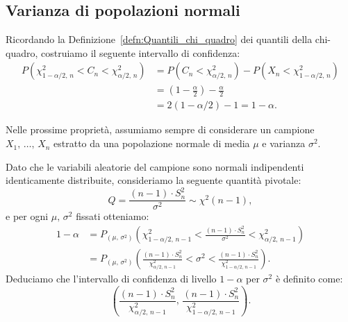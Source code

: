         \subsection{Varianza di popolazioni normali}
            \begin{defn}
                Ricordando la Definizione~\ref{defn:Quantili_chi_quadro} dei quantili della chi-quadro, 
                costruiamo il seguente intervallo di confidenza:
                \begin{align*}
                    P(\chi^2_{1-\alpha /2,\,n} < C_n < \chi^2_{\alpha /2,\,n}) &=
                    P(C_n < \chi^2_{\alpha /2,\,n}) - P(X_n < \chi^2_{1-\alpha /2,\,n}) \\
                    &= \left(1-\frac{\alpha}{2}\right) -\frac{\alpha}{2} \\
                    &= 2(1-\alpha /2) -1 = 1-\alpha
                .\end{align*}
            \end{defn}
            \begin{note}
                Nelle prossime proprietà, assumiamo sempre di considerare un campione $X_1,\, \ldots,\, X_{n}$ 
                estratto da una popolazione normale di media $\mu$ e varianza $\sigma^2$.
            \end{note}
            \begin{prty}[Intervallo bilatero con $\mu =\,?,\, \sigma^2 =\,?$]
                Dato che le variabili aleatorie del campione sono normali indipendenti identicamente 
                distribuite, consideriamo la seguente quantità pivotale: \[
                    Q = \frac{(n-1)\cdot S_n^2}{\sigma^2} \sim \chi^2(n-1)
                ,\] e per ogni $\mu,\, \sigma^2$ fissati otteniamo:
                \begin{align*}
                    1-\alpha &= P_{(\mu,\,\sigma^2)}\left(\chi^2_{1-\alpha /2,\,n-1} 
                    < \frac{(n-1)\cdot S_n^2}{\sigma^2} < \chi^2_{\alpha /2,\,n-1}\right) \\
                    &= P_{(\mu,\,\sigma^2)}\left(\frac{(n-1)\cdot S_n^2}{\chi^2_{\alpha /2,\,n-1}} 
                    < \sigma^2 < \frac{(n-1)\cdot S_n^2}{\chi^2_{1-\alpha /2,\,n-1}}\right)
                .\end{align*}
                Deduciamo che l'intervallo di confidenza di livello $1-\alpha$ per $\sigma^2$ è definito come: \[
                    \left(\frac{(n-1)\cdot S_n^2}{\chi^2_{\alpha /2,\,n-1}},\, 
                    \frac{(n-1)\cdot S_n^2}{\chi^2_{1-\alpha /2,\,n-1}}\right)
                .\] 
            \end{prty}
